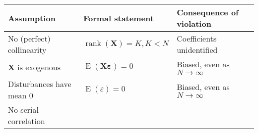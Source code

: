 \documentclass[]{book}
\DeclareMathOperator{\E}{E}
\DeclareMathOperator{\rank}{rank}
\newcommand{\mat}[1]{\boldsymbol{#1}}
\renewcommand{\vec}[1]{\boldsymbol{#1}}
\begin{document}
\begin{longtable}[c]{@{}lll@{}}
\toprule
\begin{minipage}[b]{0.27\columnwidth}\raggedright\strut
Assumption
\strut\end{minipage} &
\begin{minipage}[b]{0.27\columnwidth}\raggedright\strut
Formal statement
\strut\end{minipage} &
\begin{minipage}[b]{0.32\columnwidth}\raggedright\strut
Consequence of violation
\strut\end{minipage}\tabularnewline
\midrule
\endhead
\begin{minipage}[t]{0.27\columnwidth}\raggedright\strut
No (perfect) collinearity
\strut\end{minipage} &
\begin{minipage}[t]{0.27\columnwidth}\raggedright\strut
\(\rank(\mat{X}) = K, K < N\)
\strut\end{minipage} &
\begin{minipage}[t]{0.32\columnwidth}\raggedright\strut
Coefficients unidentified
\strut\end{minipage}\tabularnewline
\begin{minipage}[t]{0.27\columnwidth}\raggedright\strut
\(\mat{X}\) is exogenous
\strut\end{minipage} &
\begin{minipage}[t]{0.27\columnwidth}\raggedright\strut
\(\E(\mat{X} \vec{\varepsilon}) = 0\)
\strut\end{minipage} &
\begin{minipage}[t]{0.32\columnwidth}\raggedright\strut
Biased, even as \(N \to \infty\)
\strut\end{minipage}\tabularnewline
\begin{minipage}[t]{0.27\columnwidth}\raggedright\strut
Disturbances have mean 0
\strut\end{minipage} &
\begin{minipage}[t]{0.27\columnwidth}\raggedright\strut
\(\E(\varepsilon) = 0\)
\strut\end{minipage} &
\begin{minipage}[t]{0.32\columnwidth}\raggedright\strut
Biased, even as \(N \to \infty\)
\strut\end{minipage}\tabularnewline
\begin{minipage}[t]{0.27\columnwidth}\raggedright\strut
No serial correlation
\strut\end{minipage} &
\begin{minipage}[t]{0.27\columnwidth}\raggedright\strut

\end{minipage}
\end{longtable}
\end{document}
